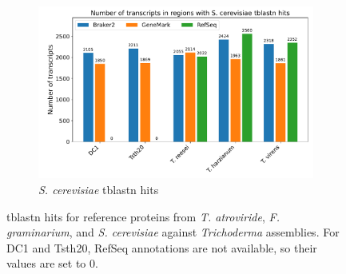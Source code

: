 \begin{figure}[htp]\ContinuedFloat
  \centering
  \begin{subfigure}[b]{0.85\textwidth}
    \includegraphics[width=\textwidth]{figures/blast-scerevisiae.pdf}
    \caption{\textit{S. cerevisiae} tblastn hits}
    \label{fig:blast-scerevisiae}
  \end{subfigure}
  \caption[Results from tblastn by reference]{tblastn hits for reference proteins from \textit{T. atroviride}, \textit{F. graminarium}, and \textit{S. cerevisiae} against \textit{Trichoderma} assemblies. For DC1 and Tsth20, RefSeq annotations are not available, so their values are set to 0.}
  \label{fig:blast-hits}
\end{figure}

